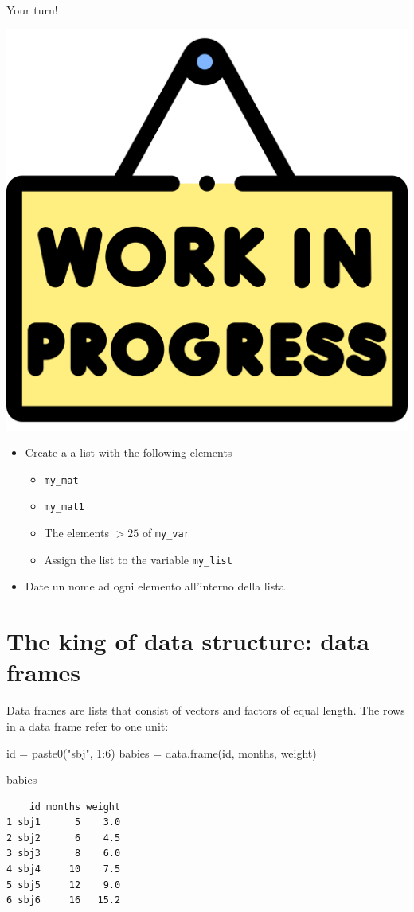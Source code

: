 \documentclass[
  ignorenonframetext,
]{beamer}
\newenvironment{Shaded}{\begin{snugshade}}{\end{snugshade}}
\newcommand{\DecValTok}[1]{\textcolor[rgb]{0.69,0.50,0.00}{#1}}
\newcommand{\FunctionTok}[1]{\textcolor[rgb]{0.39,0.29,0.61}{#1}}
\newcommand{\NormalTok}[1]{\textcolor[rgb]{0.12,0.11,0.11}{#1}}
\newcommand{\OtherTok}[1]{\textcolor[rgb]{0.00,0.43,0.16}{#1}}
\newcommand{\SpecialCharTok}[1]{\textcolor[rgb]{0.24,0.68,0.91}{#1}}
\newcommand{\StringTok}[1]{\textcolor[rgb]{0.75,0.01,0.01}{#1}}
\providecommand{\tightlist}{%
  \setlength{\itemsep}{0pt}\setlength{\parskip}{0pt}}
\begin{document}
\begin{frame}[fragile]{Your turn!}
\protect\hypertarget{your-turn-4}{}
\begin{center}\includegraphics[width=0.15\linewidth]{img/work} \end{center}

\begin{itemize}
\tightlist
\item
  Create a a list with the following elements

  \begin{itemize}
  \tightlist
  \item
    \texttt{my\_mat}
  \item
    \texttt{my\_mat1}
  \item
    The elements \(> 25\) of \texttt{my\_var}
  \item
    Assign the list to the variable \texttt{my\_list}
  \end{itemize}
\item
  Date un nome ad ogni elemento all'interno della lista
\end{itemize}
\end{frame}

\hypertarget{the-king-of-data-structure-data-frames}{%
\section{The king of data structure: data
frames}\label{the-king-of-data-structure-data-frames}}

\begin{frame}[fragile]{}
\protect\hypertarget{section-4}{}
Data frames are lists that consist of vectors and factors of equal
length. The rows in a data frame refer to one unit:

\begin{Shaded}
\begin{Highlighting}[]
\NormalTok{id }\OtherTok{=} \FunctionTok{paste0}\NormalTok{(}\StringTok{"sbj"}\NormalTok{, }\DecValTok{1}\SpecialCharTok{:}\DecValTok{6}\NormalTok{)}
\NormalTok{babies }\OtherTok{=} \FunctionTok{data.frame}\NormalTok{(id, months, weight)}
\end{Highlighting}
\end{Shaded}

\begin{Shaded}
\begin{Highlighting}[]
\NormalTok{babies}
\end{Highlighting}
\end{Shaded}

\begin{verbatim}
    id months weight
1 sbj1      5    3.0
2 sbj2      6    4.5
3 sbj3      8    6.0
4 sbj4     10    7.5
5 sbj5     12    9.0
6 sbj6     16   15.2
\end{verbatim}
\end{frame}
\end{document}
